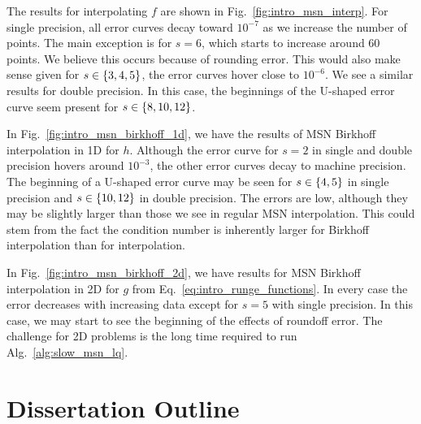 The results for interpolating $f$ are shown in Fig.~\ref{fig:intro_msn_interp}.
For single precision, all error curves decay toward $10^{-7}$ as
we increase the number of points. The main exception is for $s=6$,
which starts to increase around 60 points. We believe this occurs
because of rounding error. This would also make sense given for
$s\in\left\{ 3,4,5 \right\}$, the error curves hover close to $10^{-6}$.
We see a similar results for double precision.
In this case, the beginnings of the U-shaped error curve seem
present for $s\in\left\{ 8,10,12 \right\}$.

In Fig.~\ref{fig:intro_msn_birkhoff_1d}, we have the results
of MSN Birkhoff interpolation in 1D for $h$.
Although the error curve for $s=2$ in single and double precision hovers around
$10^{-3}$, the other error curves decay to machine precision.
The beginning of a U-shaped error curve may be seen
for $s\in\left\{ 4,5 \right\}$ in single precision and $s\in\left\{ 10,12 \right\}$
in double precision. The errors are low, although they may be slightly
larger than those we see in regular MSN interpolation.
This could stem from the fact the condition number is inherently larger for
Birkhoff interpolation than for interpolation.

In Fig.~\ref{fig:intro_msn_birkhoff_2d},
we have results for MSN Birkhoff interpolation in 2D
for $g$ from Eq.~\eqref{eq:intro_runge_functions}.
In every case the error decreases with increasing data except
for $s=5$ with single precision. In this case, we may start
to see the beginning of the effects of roundoff error.
The challenge for 2D problems is the long time required to
run Alg.~\ref{alg:slow_msn_lq}.





\section{Dissertation Outline}
\label{sec:dis_outline}

